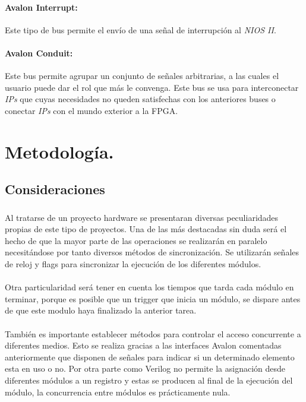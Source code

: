 \documentclass[a4paper,12pt,titlepage,final]{book}
\begin{document}
\paragraph{Avalon Interrupt:}
Este tipo de bus permite el envío de una señal de interrupción al \textit{NIOS II}.
 
\paragraph{Avalon Conduit:}
Este bus permite agrupar un conjunto de señales arbitrarias, a las cuales el usuario puede dar el rol que más le convenga. Este bus se usa para interconectar \textit{IPs} que cuyas necesidades no queden satisfechas con los anteriores buses o conectar \textit{IPs} con el mundo exterior a la FPGA.

\section{Metodología.}
\subsection{Consideraciones}
\subsubsection*{}

\paragraph{}
Al tratarse de un proyecto hardware se presentaran diversas peculiaridades propias de este tipo de proyectos. Una de las más destacadas sin duda será el hecho de que la mayor parte de las operaciones se realizarán en paralelo necesitándose por tanto diversos métodos de sincronización. Se utilizarán señales de reloj y flags para sincronizar la ejecución de los diferentes módulos.

\paragraph{}
Otra particularidad será tener en cuenta los tiempos que tarda cada módulo en terminar, porque es posible que un trigger que inicia un módulo, se dispare antes de que este modulo haya finalizado la anterior tarea.

\paragraph{}
También es importante establecer métodos para controlar el acceso concurrente a diferentes medios. Esto se realiza gracias a las interfaces Avalon comentadas anteriormente que disponen de señales para indicar si un determinado elemento esta en uso o no. Por otra parte como Verilog no permite la asignación desde diferentes módulos a un registro y estas se producen al final de la ejecución del módulo, la concurrencia entre módulos es prácticamente nula.
\end{document}
